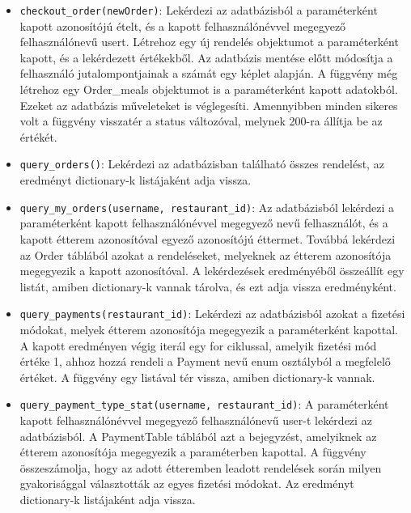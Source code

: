
\begin{itemize}
\item \texttt{checkout\_order(newOrder)}:
Lekérdezi az adatbázisból a paraméterként kapott azonosítójú ételt, és a kapott felhasználónévvel megegyező felhasználónevű usert. Létrehoz egy új rendelés objektumot a paraméterként kapott, és a lekérdezett értékekből. Az adatbázis mentése előtt módosítja a felhasználó jutalompontjainak a számát egy képlet alapján. A függvény még létrehoz egy Order\_meals objektumot is a paraméterként kapott adatokból. Ezeket az adatbázis műveleteket is véglegesíti. Amennyibben minden sikeres volt a függvény visszatér a status változóval, melynek 200-ra állítja be az értékét.
\item \texttt{query\_orders()}:
Lekérdezi az adatbázisban található összes rendelést, az eredményt dictionary-k listájaként adja vissza.
\item \texttt{query\_my\_orders(username, restaurant\_id)}:
Az adatbázisból lekérdezi a paraméterként kapott felhasználónévvel megegyező nevű felhasználót, és a kapott étterem azonosítóval egyező azonosítójú éttermet. Továbbá lekérdezi az Order táblából azokat a rendeléseket, melyeknek az étterem azonosítója megegyezik a kapott azonosítóval. A lekérdezések eredményéből összeállít egy listát, amiben dictionary-k vannak tárolva, és ezt adja vissza eredményként.
\end{itemize}


\begin{itemize}
\item \texttt{query\_payments(restaurant\_id)}:
Lekérdezi az adatbázisból azokat a fizetési módokat, melyek étterem azonosítója megegyezik a paraméterként kapottal. A kapott eredményen végig iterál egy for ciklussal, amelyik fizetési mód értéke 1, ahhoz hozzá rendeli a Payment nevű enum osztályból a megfelelő értéket. A függvény egy listával tér vissza, amiben dictionary-k vannak.
\item \texttt{query\_payment\_type\_stat(username, restaurant\_id)}: 
A paraméterként kapott felhasználónévvel megegyező felhasználónevű user-t lekérdezi az adatbázisból. A PaymentTable táblából azt a bejegyzést, amelyiknek az étterem azonosítója megegyezik a paraméterben kapottal. A függvény összeszámolja, hogy az adott étteremben leadott rendelések során milyen gyakorisággal választották az egyes fizetési módokat. Az eredményt dictionary-k listájaként adja vissza.
\end{itemize}

